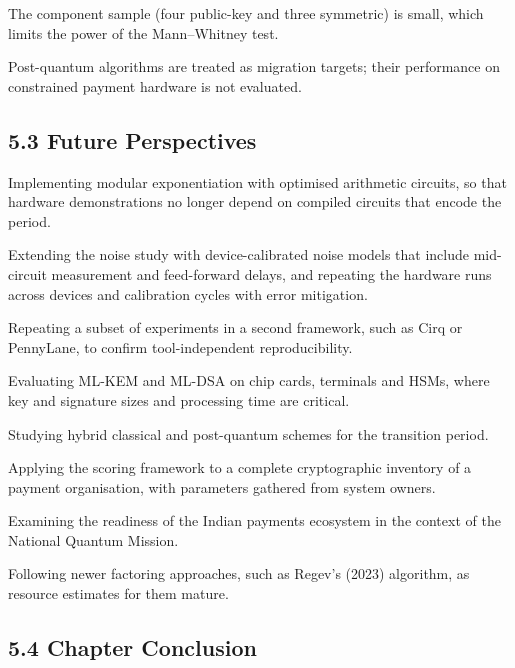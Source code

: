 \documentclass[12pt,oneside]{report}
\begin{document}
The component sample (four public-key and three symmetric) is small, which limits the power of the Mann–Whitney test.
\par

Post-quantum algorithms are treated as migration targets; their performance on constrained payment hardware is not evaluated.
\par

\subsection*{5.3 Future Perspectives}

Implementing modular exponentiation with optimised arithmetic circuits, so that hardware demonstrations no longer depend on compiled circuits that encode the period.
\par

Extending the noise study with device-calibrated noise models that include mid-circuit measurement and feed-forward delays, and repeating the hardware runs across devices and calibration cycles with error mitigation.
\par

Repeating a subset of experiments in a second framework, such as Cirq or PennyLane, to confirm tool-independent reproducibility.
\par

Evaluating ML-KEM and ML-DSA on chip cards, terminals and HSMs, where key and signature sizes and processing time are critical.
\par

Studying hybrid classical and post-quantum schemes for the transition period.
\par

Applying the scoring framework to a complete cryptographic inventory of a payment organisation, with parameters gathered from system owners.
\par

Examining the readiness of the Indian payments ecosystem in the context of the National Quantum Mission.
\par

Following newer factoring approaches, such as Regev's (2023) algorithm, as resource estimates for them mature.
\par

\subsection*{5.4 Chapter Conclusion}
\end{document}
